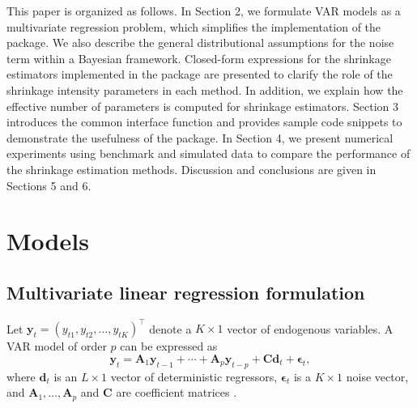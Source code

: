 This paper is organized as follows. In Section 2, we
formulate VAR models as a multivariate regression
problem, which simplifies the implementation of the package.
We also describe the general distributional assumptions for the noise term
within a Bayesian framework.
Closed-form expressions for the shrinkage estimators implemented in the package are presented to clarify the role of the shrinkage intensity parameters in each method.
In addition, we explain how the effective
number of parameters is computed for shrinkage estimators.
Section 3 introduces the common interface function and provides sample code snippets to demonstrate the usefulness of the package.
In Section 4, we present numerical experiments using benchmark and
simulated data to compare the performance of the shrinkage estimation
methods. Discussion and conclusions are given in Sections 5 and 6.

\section{Models}\label{models}

\subsection{Multivariate linear regression formulation}\label{multivariate-linear-regression-formulation}

Let \(\mathbf{y}_t = (y_{t1},y_{t2},\ldots,y_{tK})^\top\) denote a
\(K\times 1\) vector of endogenous variables. A VAR model of order
\(p\) can be expressed as
\begin{equation}
    \mathbf{y}_t = \mathbf{A}_1 \mathbf{y}_{t-1} + \cdots + \mathbf{A}_p \mathbf{y}_{t-p} + \mathbf{C} \mathbf{d}_t + \boldsymbol\epsilon_t,
    \label{eq:VAReqnA}
\end{equation}
where \(\mathbf{d}_t\) is an \(L\times 1\) vector of deterministic
regressors, \(\boldsymbol\epsilon_t\) is a \(K\times 1\) noise vector,
and \(\mathbf{A}_1,\ldots,\mathbf{A}_p\) and \(\mathbf{C}\) are
coefficient matrices \citep{Hamilton94, Tsay05}.

